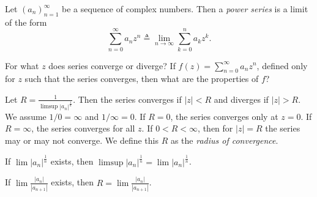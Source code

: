 \begin{defn}
Let $(a_n)_{n=1}^\infty$ be a sequence of complex numbers.
Then a \emph{power series} is a limit of the form
$$
           \sum_{n=0}^\infty a_n z^n
\triangleq \lim_{n \to \infty} \sum_{k=0}^n a_k z^k.
$$
\end{defn}

For what $z$ does series converge or diverge?
If $f(z) = \sum_{n=0}^\infty a_n z^n$, defined only
for $z$ such that the series converges, then what
are the properties of $f$?

\begin{theorem}
  Let $R = \frac{1}{\limsup |a_n|^{\frac{1}{n}}}$.
  Then the series converges if $|z| < R$ and diverges
  if $|z| > R$. We assume $1 / 0 = \infty$ and
  $1 / \infty = 0$. If $R = 0$, the series converges
  only at $z = 0$. If $R = \infty$, the series converges
  for all $z$. If $0 < R < \infty$, then for $|z| = R$
  the series may or may not converge. We define this
  $R$ as the \emph{radius of convergence}.
\end{theorem}

\begin{prop}
  If $\lim |a_n|^{\frac{1}{n}}$ exists, then
  $\limsup |a_n|^{\frac{1}{n}} = \lim |a_n|^{\frac{1}{n}}$.

  If $\lim \frac{|a_n|}{|a_{n+1}|}$ exists, then
  $R = \lim \frac{|a_n|}{|a_{n+1}|}$.
\end{prop}

